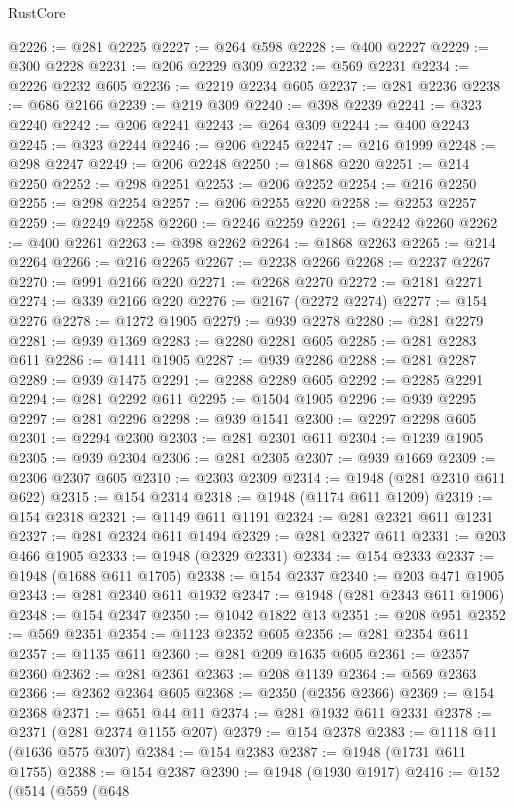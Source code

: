 \begin{lexlean}{RustCore}
\begin{coremodule}
@2226 := @281 @2225
@2227 := @264 @598
@2228 := @400 @2227
@2229 := @300 @2228
@2231 := @206 @2229 @309
@2232 := @569 @2231
@2234 := @2226 @2232 @605
@2236 := @2219 @2234 @605
@2237 := @281 @2236
@2238 := @686 @2166
@2239 := @219 @309
@2240 := @398 @2239
@2241 := @323 @2240
@2242 := @206 @2241
@2243 := @264 @309
@2244 := @400 @2243
@2245 := @323 @2244
@2246 := @206 @2245
@2247 := @216 @1999
@2248 := @298 @2247
@2249 := @206 @2248
@2250 := @1868 @220
@2251 := @214 @2250
@2252 := @298 @2251
@2253 := @206 @2252
@2254 := @216 @2250
@2255 := @298 @2254
@2257 := @206 @2255 @220
@2258 := @2253 @2257
@2259 := @2249 @2258
@2260 := @2246 @2259
@2261 := @2242 @2260
@2262 := @400 @2261
@2263 := @398 @2262
@2264 := @1868 @2263
@2265 := @214 @2264
@2266 := @216 @2265
@2267 := @2238 @2266
@2268 := @2237 @2267
@2270 := @991 @2166 @220
@2271 := @2268 @2270
@2272 := @2181 @2271
@2274 := @339 @2166 @220
@2276 := @2167 (@2272 @2274)
@2277 := @154 @2276
@2278 := @1272 @1905
@2279 := @939 @2278
@2280 := @281 @2279
@2281 := @939 @1369
@2283 := @2280 @2281 @605
@2285 := @281 @2283 @611
@2286 := @1411 @1905
@2287 := @939 @2286
@2288 := @281 @2287
@2289 := @939 @1475
@2291 := @2288 @2289 @605
@2292 := @2285 @2291
@2294 := @281 @2292 @611
@2295 := @1504 @1905
@2296 := @939 @2295
@2297 := @281 @2296
@2298 := @939 @1541
@2300 := @2297 @2298 @605
@2301 := @2294 @2300
@2303 := @281 @2301 @611
@2304 := @1239 @1905
@2305 := @939 @2304
@2306 := @281 @2305
@2307 := @939 @1669
@2309 := @2306 @2307 @605
@2310 := @2303 @2309
@2314 := @1948 (@281 @2310 @611 @622)
@2315 := @154 @2314
@2318 := @1948 (@1174 @611 @1209)
@2319 := @154 @2318
@2321 := @1149 @611 @1191
@2324 := @281 @2321 @611 @1231
@2327 := @281 @2324 @611 @1494
@2329 := @281 @2327 @611
@2331 := @203 @466 @1905
@2333 := @1948 (@2329 @2331)
@2334 := @154 @2333
@2337 := @1948 (@1688 @611 @1705)
@2338 := @154 @2337
@2340 := @203 @471 @1905
@2343 := @281 @2340 @611 @1932
@2347 := @1948 (@281 @2343 @611 @1906)
@2348 := @154 @2347
@2350 := @1042 @1822 @13
@2351 := @208 @951
@2352 := @569 @2351
@2354 := @1123 @2352 @605
@2356 := @281 @2354 @611
@2357 := @1135 @611
@2360 := @281 @209 @1635 @605
@2361 := @2357 @2360
@2362 := @281 @2361
@2363 := @208 @1139
@2364 := @569 @2363
@2366 := @2362 @2364 @605
@2368 := @2350 (@2356 @2366)
@2369 := @154 @2368
@2371 := @651 @44 @11
@2374 := @281 @1932 @611 @2331
@2378 := @2371 (@281 @2374 @1155 @207)
@2379 := @154 @2378
@2383 := @1118 @11 (@1636 @575 @307)
@2384 := @154 @2383
@2387 := @1948 (@1731 @611 @1755)
@2388 := @154 @2387
@2390 := @1948 (@1930 @1917)
@2416 := @152
    (@514
      (@559
        (@648

\end{coremodule}
\end{lexlean}
